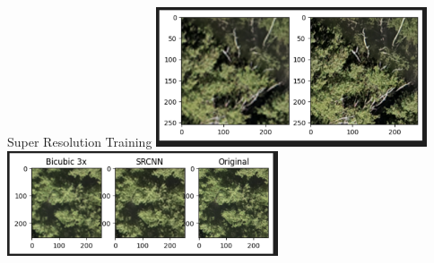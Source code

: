 \begin{frame}{Super Resolution Training}
    \centering
    \includegraphics[height=0.5\textheight,width=0.6\textwidth,keepaspectratio]{images/Artificial_Downsample.png}
    \includegraphics[height=0.5\textheight,width=0.6\textwidth,keepaspectratio]{images/Upsample_compare.png}
\end{frame}






